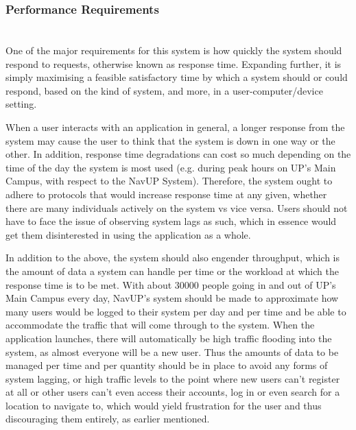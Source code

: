 \subsubsection{Performance Requirements}

	\paragraph{}
	\mbox{}\\
One of the major requirements for this system is how quickly the system should respond to requests, 
otherwise known as response time. Expanding further, it is simply maximising a feasible satisfactory
time by which a system should or could respond, based on the kind of system, and more, in a 
user-computer/device setting. 

When a user interacts with an application in general, a longer response from the system may cause 
the user to think that the system is down in one way or the other. In addition, response time degradations 
can cost so much depending on the time of the day the system is most used (e.g. during peak hours on UP’s 
Main Campus, with respect to the NavUP System). 
Therefore, the system ought to adhere to protocols that would increase response time at any given,
whether there are many individuals actively on the system vs vice versa. Users should not have to 
face the issue of observing system lags as such, which in essence would get them disinterested in
using the application as a whole. 

In addition to the above, the system should also engender throughput, which is the amount of data 
a system can handle per time or the workload at which the response time is to be met. With about 
30000 people going in and out of UP’s Main Campus every day, NavUP’s system should be made to approximate 
how many users would  be logged to their system per day and per time and be able to accommodate the 
traffic that will come through to the system. 
When the application launches, there will automatically be high traffic flooding into the system, 
as almost everyone will be a new user. Thus the amounts of data to be managed per time and per quantity 
should be in place to avoid any forms of system lagging, or high traffic levels to the point where new users 
can’t register at all or other users can’t even access their accounts, log in or even search for a location
to navigate to, which would yield frustration for the user and thus discouraging them entirely,
as earlier mentioned. 

